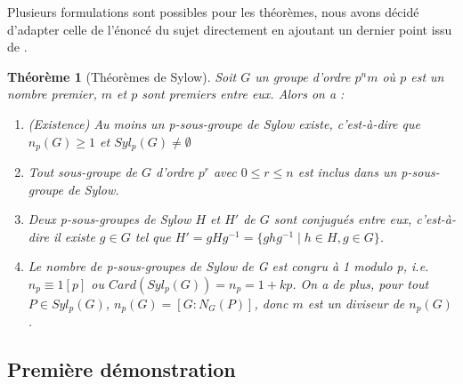 \documentclass[french]{article}
\theoremstyle{definition}
\theoremstyle{plain}
\newtheorem{theorem}[subsubsection]{Théorème}
\theoremstyle{plain}
\theoremstyle{plain}
\theoremstyle{plain}
\theoremstyle{plain}
\begin{document}
Plusieurs formulations sont possibles pour les théorèmes, 
nous avons décidé d'adapter celle de l'énoncé du sujet directement en ajoutant un dernier point issu de \cite[p.~215]{chen2024napkin}.

\begin{theorem}[Théorèmes de Sylow]
	Soit \( G \) un groupe d'ordre \( p^{n}m \) où \( p \) est un nombre premier, \( m \) et \( p \) sont premiers entre eux. Alors on a :
	\begin{enumerate}[label={\upshape(\roman*)}]
		\item (Existence) Au moins un p-sous-groupe de Sylow existe, c'est-à-dire que \( n_{p}(G) \geq 1 \) et \( Syl_{p}(G) \neq \emptyset \)
		\item Tout sous-groupe de \( G \) d'ordre \( p^{r} \) avec \( 0 \leq r \leq n \) est inclus dans un p-sous-groupe de Sylow.
		\item Deux p-sous-groupes de Sylow \( H \) et \( H' \) de \( G \) sont conjugués entre eux, c'est-à-dire il existe \( g \in G \) tel que \( H' = gHg^{-1} = \{ ghg^{-1} \mid h \in H, g \in G \} \).
		\item Le nombre de p-sous-groupes de Sylow de G est congru à 1 modulo p, i.e. \( n_{p} \equiv 1 [p] \) ou \( Card(Syl_{p}({G})) = n_{p} = 1 + kp \).
			On a de plus, pour tout \( P \in Syl_{p}({G}) \), \( n_{p}({G}) = [G : N_{G}({P}) ] \), donc \( m \) est un diviseur de \( n_p({G}) \).

	\end{enumerate}

\end{theorem}

\subsection{Première démonstration}
\end{document}
